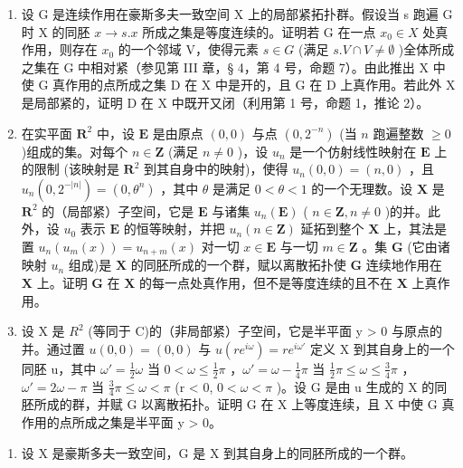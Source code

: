 \begin{enumerate}
\def\labelenumi{\alph{enumi})}
\item
  设 G 是连续作用在豪斯多夫一致空间 X 上的局部紧拓扑群。假设当 s 跑遍 G 时 X 的同胚 \(x \rightarrow s.x\) 所成之集是等度连续的。证明若 G 在一点 \(x_{0} \in X\) 处真作用，则存在 \(x_{0}\) 的一个邻域 V，使得元素 \(s \in G\) (满足 \(s.V \cap V \neq \emptyset\) )全体所成之集在 G 中相对紧（参见第 III 章，§ 4，第 4 号，命题 7）。由此推出 X 中使 G 真作用的点所成之集 D 在 X 中是开的，且 G 在 D 上真作用。若此外 X 是局部紧的，证明 D 在 X 中既开又闭（利用第 1 号，命题 1，推论 2）。
\item
  在实平面 \(\mathbf{R}^2\) 中，设 \(\mathbf{E}\) 是由原点 \((0,0)\) 与点 \((0,2^{-n})\) (当 \(n\) 跑遍整数 \(\geqslant 0\) )组成的集。对每个 \(n\in \mathbf{Z}\) (满足 \(n\neq 0\) )，设 \(u_{n}\) 是一个仿射线性映射在 \(\mathbf{E}\) 上的限制 (该映射是 \(\mathbf{R}^2\) 到其自身中的映射)，使得 \(u_{n}(0,0) = (n,0)\) ，且 \(u_{n}(0,2^{-|n|}) = (0,\theta^{n})\) ，其中 \(\theta\) 是满足 \(0 <   \theta <  1\) 的一个无理数。设 \(\mathbf{X}\) 是 \(\mathbf{R}^2\) 的（局部紧）子空间，它是 \(\mathbf{E}\) 与诸集 \(u_{n}(\mathbf{E})\) ( \(n\in \mathbf{Z},n\neq 0\) )的并。此外，设 \(u_{0}\) 表示 \(\mathbf{E}\) 的恒等映射，并把 \(u_{n}(n\in \mathbf{Z})\) 延拓到整个 \(\mathbf{X}\) 上，其法是置 \(u_{n}(u_{m}(x)) = u_{n + m}(x)\) 对一切 \(x\in \mathbf{E}\) 与一切 \(m\in \mathbf{Z}\) 。集 \(\mathbf{G}\) (它由诸映射 \(u_{n}\) 组成)是 \(\mathbf{X}\) 的同胚所成的一个群，赋以离散拓扑使 \(\mathbf{G}\) 连续地作用在 \(\mathbf{X}\) 上。证明 \(\mathbf{G}\) 在 \(\mathbf{X}\) 的每一点处真作用，但不是等度连续的且不在 \(\mathbf{X}\) 上真作用。
\item
  设 X 是 \(R^{2}\) (等同于 C)的（非局部紧）子空间，它是半平面 y \textgreater{} 0 与原点的并。通过置 \(u(0, 0) = (0, 0)\) 与 \(u(re^{i\omega}) = re^{i\omega'}\) 定义 X 到其自身上的一个同胚 u，其中 \(\omega' = \frac{1}{2}\omega\) 当 \(0 < \omega \leqslant \frac{1}{2}\pi\) ，\(\omega' = \omega - \frac{1}{4}\pi\) 当 \(\frac{1}{2}\pi \leqslant \omega \leqslant \frac{3}{4}\pi\) ，\(\omega' = 2\omega - \pi\) 当 \(\frac{3}{4}\pi \leqslant \omega < \pi\) (r \textless{} 0, \(0 < \omega < \pi\) )。设 G 是由 u 生成的 X 的同胚所成的群，并赋 G 以离散拓扑。证明 G 在 X 上等度连续，且 X 中使 G 真作用的点所成之集是半平面 y \textgreater{} 0。
\end{enumerate}

\begin{enumerate}
\def\labelenumi{\arabic{enumi})}
\setcounter{enumi}{18}
\tightlist
\item
  设 X 是豪斯多夫一致空间，G 是 X 到其自身上的同胚所成的一个群。
\end{enumerate}

